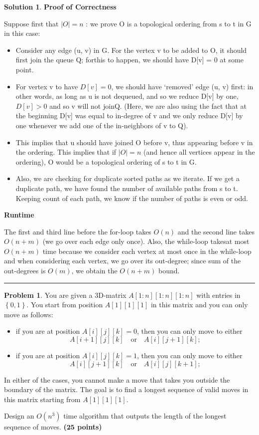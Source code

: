 \documentclass{article}
\theoremstyle{definition}
\newtheorem{problem}{Problem}
\def\fline{\rule{0.75\linewidth}{0.5pt}}
\newcommand{\finishline}{\begin{center}\fline\end{center}}
\newtheorem*{solution*}{Solution}
\newenvironment{solution}{\begin{solution*}}{{\finishline} \end{solution*}}
\newcommand{\grade}[1]{\hfill{\textbf{($\mathbf{#1}$ points)}}}
\newcommand{\set}[1]{\ensuremath{\left\{ #1 \right\}}}
\begin{document}
\begin{solution}
	\item \textbf{Proof of Correctness}
	\item Suppose first that $|O|=n$ :  we prove O is a topological ordering from s to t in G in this case:
	\begin{itemize}
	\item Consider any edge (u, v) in G.  For the vertex v to be added to O, it should first join the queue Q; forthis to happen, we should have D[v] = 0 at some point.
	\item For vertex v to have $D[v] = 0$, we should have ‘removed’ edge (u, v) first:  in other words, as long as u is not dequeued, and so we reduce D[v] by one, $D[v]>0$ and so v will not joinQ.  (Here, we are also using the fact that at the beginning D[v] was equal to in-degree of v and we only reduce D[v] by one whenever we add one of the in-neighbors of v to Q).
	\item This implies that u should have joined O before v, thus appearing before v in the ordering. This implies that if $|O|=n$ (and hence all vertices appear in the ordering), O would be a topological ordering of s to t in G.
	\item Also, we are checking for duplicate sorted paths as we iterate. If we get a duplicate path, we have found the number of available paths from s to t. Keeping count of each path, we know if the number of paths is even or odd. 
	\end{itemize}
	
	\item \textbf{Runtime}
	\item The first and third line before the for-loop takes $O(n)$ and the second line takes $O(n+m)$ (we go over each edge only once).  Also, the while-loop takesat most $O(n+m)$ time because we consider each vertex at most once in the while-loop and when considering each vertex, we go over its out-degree; since sum of the out-degrees is $O(m)$, we obtain the $O(n+m)$ bound.

\end{solution}

\bigskip

\begin{problem}
	You are given a 3D-matrix $A[1:n][1:n][1:n]$ with entries in $\set{0,1}$.  You start from position $A[1][1][1]$ in this matrix and you can only move as follows: 
	
	\begin{itemize}
	\item if you are at position $A[i][j][k] = 0$, then you can only move to either
	\[
	A[i+1][j][k] \quad \text{or} \quad A[i][j+1][k];
	\]
	 \item  if you are at position $A[i][j][k] = 1$, then you can only move to either
	 \[
	 	A[i][j+1][k] \quad \text{or} \quad A[i][j][k+1];
	 \]
	 \end{itemize}
	In either of the cases, you cannot make a move that takes you outside the boundary of the matrix. 
	 The goal is to find a longest sequence of valid moves in this matrix starting from $A[1][1][1]$. 
	 
	 Design an $O(n^3)$ time algorithm that outputs the length of the longest sequence of  moves.  \grade{25}
\end{problem}
\end{document}
